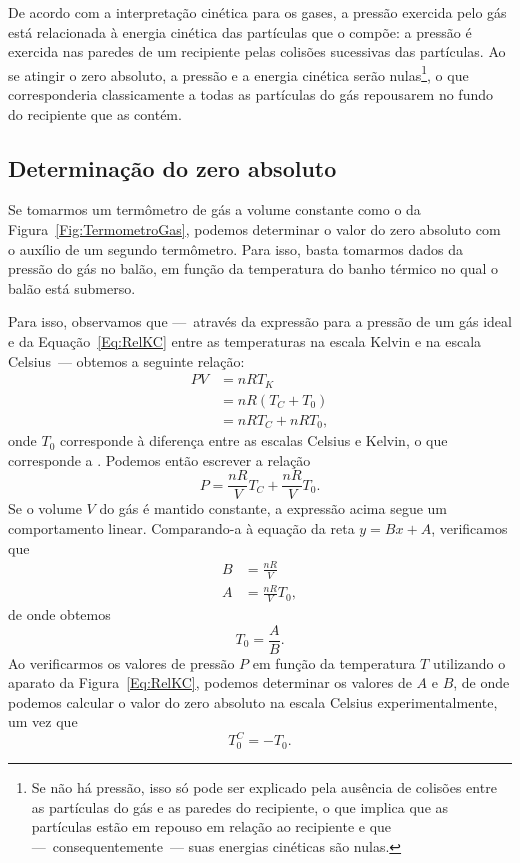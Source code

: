 De acordo com a interpretação cinética para os gases, a pressão exercida pelo gás está relacionada à energia cinética das partículas que o compõe: a pressão é exercida nas paredes de um recipiente pelas colisões sucessivas das partículas. Ao se atingir o zero absoluto, a pressão e a energia cinética serão nulas\footnote{Se não há pressão, isso só pode ser explicado pela ausência de colisões entre as partículas do gás e as paredes do recipiente, o que implica que as partículas estão em repouso em relação ao recipiente e que ---~consequentemente~--- suas energias cinéticas são nulas.}, o que corresponderia classicamente a todas as partículas do gás repousarem no fundo do recipiente que as contém.

\subsection{Determinação do zero absoluto}

Se tomarmos um termômetro de gás a volume constante como o da Figura~\ref{Fig:TermometroGas}, podemos determinar o valor do zero absoluto com o auxílio de um segundo termômetro. Para isso, basta tomarmos dados da pressão do gás no balão, em função da temperatura do banho térmico no qual o balão está submerso.

Para isso, observamos que ---~através da expressão para a pressão de um gás ideal e da Equação~\eqref{Eq:RelKC} entre as temperaturas na escala Kelvin e na escala Celsius~--- obtemos a seguinte relação:
\begin{align}
    PV &= nRT_K \\
    &= nR(T_C + T_0) \\
    &= nRT_C + nRT_0,
\end{align}
%
onde $T_0$ corresponde à diferença entre as escalas Celsius e Kelvin, o que corresponde a . Podemos então escrever a relação
\begin{equation}
    P = \frac{nR}{V}T_C + \frac{nR}{V}T_0.
\end{equation}
%
Se o volume $V$ do gás é mantido constante, a expressão acima segue um comportamento linear. Comparando-a à equação da reta $y = Bx + A$, verificamos que
\begin{align}
    B &= \frac{nR}{V} \\
    A &= \frac{nR}{V}T_0,
\end{align}
%
de onde obtemos
\begin{equation}\label{Eq:EqRazaoABZeroAbs1}
    T_0 = \frac{A}{B}.
\end{equation}
%
Ao verificarmos os valores de pressão $P$ em função da temperatura $T$ utilizando o aparato da Figura~\ref{Eq:RelKC}, podemos determinar os valores de $A$ e $B$, de onde podemos calcular o valor do zero absoluto na escala Celsius experimentalmente, um vez que 
\begin{equation}\label{Eq:EqRazaoABZeroAbs2}
    T_0^C = - T_0.
\end{equation}

